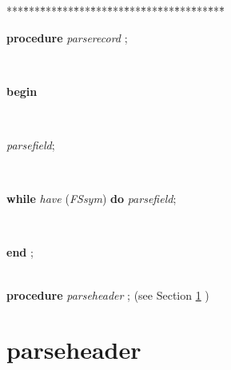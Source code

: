 \begin{tabbing}
***\=***\=***\=***\=***\=***\=***\=***\=***\=***\=***\=***\=***\=\kill
\parbox{14cm}{\textsf{\textbf{procedure}  \textit{parserecord} ;}}\\
\+\parbox{14cm}{\textsf{\textbf{begin} }}\\
\parbox{14cm}{\textsf{\textit{parsefield}}; }\\
\parbox{14cm}{\textsf {\textbf {while } \textsf{\textit{have} (\textit{FSsym})} \textbf{ do } \textsf{\textit{parsefield}}; }}\\
\<\-\parbox{14cm}{\textsf{\textbf{end} ;}}\\
\+\textsf{\textbf{procedure}  \textit{parseheader} ;} (see Section \ref{sec:csvfilereader/getdatamatrix/recursedown/recurse/getcolheaders/recurse/getrowheaders/recurse/colcount/getcell/removetrailingnull/onlynulls/rowcount/isint/printcsv/parsecsvfile/thetoken/peek/isoneof/nextsymbol/have/haveoneof/initialise/resolvealpha/resolvedigits/resolvetoken/markbegin/markend/setalpha/emptyfield/parsebarefield/parsedelimitedfield/appendcurrentchar/parsefield/parserecordparseheader} )\\
\end{tabbing}
\section{parseheader}\label{sec:csvfilereader/getdatamatrix/recursedown/recurse/getcolheaders/recurse/getrowheaders/recurse/colcount/getcell/removetrailingnull/onlynulls/rowcount/isint/printcsv/parsecsvfile/thetoken/peek/isoneof/nextsymbol/have/haveoneof/initialise/resolvealpha/resolvedigits/resolvetoken/markbegin/markend/setalpha/emptyfield/parsebarefield/parsedelimitedfield/appendcurrentchar/parsefield/parserecordparseheader}


